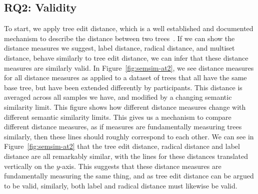 \begin{table*}[ht!]
{    }
    \caption{A comparison of the different distance measures and their suitability w.r.t. the requirements defined in Section~\ref{ssec:requirements}\\
        \footnotesize
1: These measures exclude significant information, as such their edit descriptions do not offer fully suitable descriptions of difference.\\%
2: Radical distance incorporates the position of nodes w.r.t. their parent, however, it does not incorporate the position of the radical within the whole attack tree.  %
        \normalsize}
    \label{tab:requirmeent-suitability}
    \end{table*}

\subsection{RQ2: Validity}

To start, we apply tree edit distance, which is a well established and documented mechanism to describe the distance between two trees~\cite{Zhang_Shasha_1989,zhang_editing_1992,akutsu_tree_2021,pawlik_rted_2011,mcvicar_sumoted_2016}. If we can show the distance measures we suggest, label distance, radical distance, and multiset distance, behave similarly to tree edit distance, we can infer that these distance measures are similarly valid. In Figure~\ref{fig:semsim-at2}, we see distance measures for all distance measures as applied to a dataset of trees that all have the same base tree, but have been extended differently by participants. This distance is averaged across all samples we have, and modified by a changing semantic similarity limit. This figure shows how different distance measures change with different semantic similarity limits. This gives us a mechanism to compare different distance measures, as if measures are fundamentally measuring trees similarly, then these lines should roughly correspond to each other. We can see in Figure~\ref{fig:semsim-at2} that the tree edit distance, radical distance and label distance are all remarkably similar, with the lines for these distances translated vertically on the $y$-axis. This suggests that these distance measures are fundamentally measuring the same thing, and as tree edit distance can be argued to be valid, similarly, both label and radical distance must likewise be valid.


